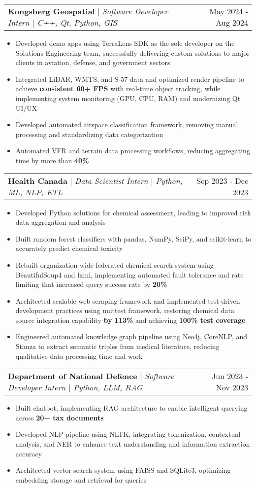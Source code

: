 \documentclass[letterpaper,10pt]{article}
\makeatletter
\newcommand{\resumeItem}[1]{
  \item\small{
    {#1 \vspace{-4pt}}
  }
}
\newcommand{\resumeSubheading}[3]{
    \item
    \begin{tabular*}{0.97\textwidth}[t]{l@{\extracolsep{\fill}}r}
      \textbf{#1} $|$ \textit{ #2} & #3 \\
    \end{tabular*}\vspace{-6pt}
}
\newcommand{\resumeItemListStart}{\begin{itemize}}
\newcommand{\resumeItemListEnd}{\end{itemize}\vspace{-5pt}}
\makeatother
\begin{document}
    \resumeSubheading{Kongsberg Geospatial}{Software Developer Intern $|$ C++, Qt, Python, GIS}{May 2024 - Aug 2024}
      \resumeItemListStart
        \resumeItem{Developed demo apps using TerraLens SDK as the sole developer on the Solutions Engineering team, successfully delivering custom solutions to major clients in aviation, defense, and government sectors}
        \resumeItem{Integrated LiDAR, WMTS, and S-57 data and optimized render pipeline to achieve \textbf{consistent 60+ FPS} with real-time object tracking, while implementing system monitoring (GPU, CPU, RAM) and modernizing Qt UI/UX}
        \resumeItem{Developed automated airspace classification framework, removing manual processing and standardizing data categorization}
        \resumeItem{Automated VFR and terrain data processing workflows, reducing aggregating time by more than \textbf{40\%}}
      \resumeItemListEnd

    \resumeSubheading{Health Canada}{Data Scientist Intern $|$ Python, ML, NLP, ETL}{Sep 2023 - Dec 2023}
      \resumeItemListStart
        \resumeItem{Developed Python solutions for chemical assessment, leading to improved risk data aggregation and analysis}
        \resumeItem{Built random forest classifiers with pandas, NumPy, SciPy, and scikit-learn to accurately predict chemical toxicity}
        \resumeItem{Rebuilt organization-wide federated chemical search system using BeautifulSoup4 and lxml, implementing automated fault tolerance and rate limiting that increased query success rate by \textbf{20\%}}
        \resumeItem{Architected scalable web scraping framework and implemented test-driven development practices using unittest framework, restoring chemical data source integration capability \textbf{by 113\%} and achieving \textbf{100\% test coverage}}
        \resumeItem{Engineered automated knowledge graph pipeline using Neo4j, CoreNLP, and Stanza to extract semantic triples from medical literature, reducing qualitative data processing time and work}
      \resumeItemListEnd

    \resumeSubheading{Department of National Defence}{Software Developer Intern $|$ Python, LLM, RAG}{Jun 2023 - Nov 2023}
      \resumeItemListStart
        \resumeItem{Built chatbot, implementing RAG architecture to enable intelligent querying across \textbf{20+ tax documents}}
        \resumeItem{Developed NLP pipeline using NLTK, integrating tokenization, contextual analysis, and NER to enhance text understanding and information extraction accuracy}
        \resumeItem{Architected vector search system using FAISS and SQLite3, optimizing embedding storage and retrieval for queries}
      \resumeItemListEnd
\end{document}
